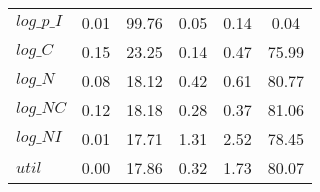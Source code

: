 \begin{center}
\begin{longtable}{lccccc}
$log\_p\_I  $	 & 	        0.01	 & 	       99.76	 & 	        0.05	 & 	        0.14	 & 	        0.04 \\ 
$log\_C     $	 & 	        0.15	 & 	       23.25	 & 	        0.14	 & 	        0.47	 & 	       75.99 \\ 
$log\_N     $	 & 	        0.08	 & 	       18.12	 & 	        0.42	 & 	        0.61	 & 	       80.77 \\ 
$log\_NC    $	 & 	        0.12	 & 	       18.18	 & 	        0.28	 & 	        0.37	 & 	       81.06 \\ 
$log\_NI    $	 & 	        0.01	 & 	       17.71	 & 	        1.31	 & 	        2.52	 & 	       78.45 \\ 
${util}     $	 & 	        0.00	 & 	       17.86	 & 	        0.32	 & 	        1.73	 & 	       80.07 \\ 
\end{longtable}
 \end{center}
